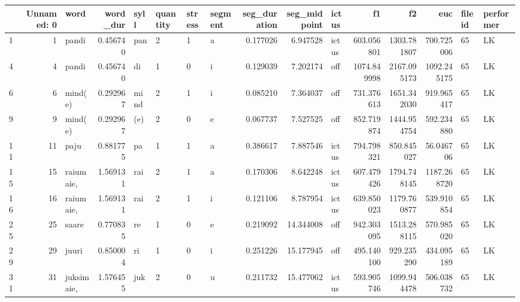\begin{tabular}{lrlrllllrrlrrrll}
\toprule
{} &  Unnamed: 0 &             word &  word\_dur &    syll & quantity & stress & segment &  seg\_duration &  seg\_midpoint &  ictus &           f1 &           f2 &          euc & fileid & performer \\
\midrule
1    &           1 &            pandi &  0.456740 &     pan &        2 &      1 &       a &      0.177026 &      6.947528 &  ictus &   603.056801 &  1303.781807 &   700.725006 &     65 &        LK \\
4    &           4 &            pandi &  0.456740 &      di &        1 &      0 &       i &      0.129039 &      7.202174 &    off &  1074.849998 &  2167.095173 &  1092.245175 &     65 &        LK \\
6    &           6 &          mind(e) &  0.292967 &    mind &        2 &      1 &       i &      0.085210 &      7.364037 &    off &   731.376613 &  1651.342030 &   919.965417 &     65 &        LK \\
9    &           9 &          mind(e) &  0.292967 &     (e) &        2 &      0 &       e &      0.067737 &      7.527525 &    off &   852.719874 &  1444.954754 &   592.234880 &     65 &        LK \\
11   &          11 &             paju &  0.881775 &      pa &        1 &      1 &       a &      0.386617 &      7.887546 &  ictus &   794.798321 &   850.845027 &    56.046706 &     65 &        LK \\
15   &          15 &        raiumaie, &  1.569131 &     rai &        2 &      1 &       a &      0.170306 &      8.642248 &  ictus &   607.479426 &  1794.748145 &  1187.268720 &     65 &        LK \\
16   &          16 &        raiumaie, &  1.569131 &     rai &        2 &      1 &       i &      0.121106 &      8.787954 &  ictus &   639.850023 &  1179.760877 &   539.910854 &     65 &        LK \\
25   &          25 &            saare &  0.770835 &      re &        1 &      0 &       e &      0.219092 &     14.344008 &    off &   942.303095 &  1513.288115 &   570.985020 &     65 &        LK \\
29   &          29 &            juuri &  0.850004 &      ri &        1 &      0 &       i &      0.251226 &     15.177945 &    off &   495.140100 &   929.235290 &   434.095189 &     65 &        LK \\
31   &          31 &       juksimaie, &  1.576455 &     juk &        2 &      0 &       u &      0.211732 &     15.477062 &  ictus &   593.905746 &  1099.944478 &   506.038732 &     65 &        LK \\

\end{tabular}
